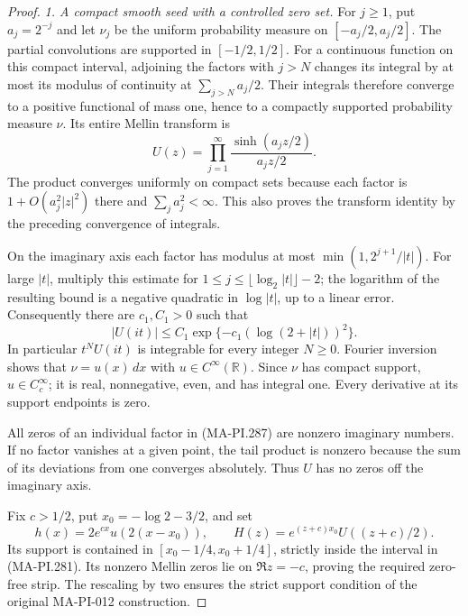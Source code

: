 \begin{proof}
\emph{1. A compact smooth seed with a controlled zero set.}
For \(j\ge1\), put \(a_j=2^{-j}\) and let \(\nu_j\)
be the uniform probability measure on
\([-a_j/2,a_j/2]\).  The partial convolutions are supported
in \([-1/2,1/2]\).  For a continuous function on this
compact interval, adjoining the factors with \(j>N\)
changes its integral by at most its modulus of continuity
at \(\sum_{j>N}a_j/2\).  Their integrals therefore converge
to a positive functional of mass one, hence to a compactly
supported probability measure \(\nu\).  Its entire Mellin
transform is
\[
 U(z)=\prod_{j=1}^{\infty}
           \frac{\sinh(a_jz/2)}{a_jz/2}.
 \tag{MA-PI.287}
\]
The product converges uniformly on compact sets because
each factor is \(1+O(a_j^2|z|^2)\) there and
\(\sum_j a_j^2<\infty\).  This also proves the transform
identity by the preceding convergence of integrals.

On the imaginary axis each factor has modulus at most
\(\min(1,2^{j+1}/|t|)\).  For large \(|t|\), multiply
this estimate for
\(1\le j\le\lfloor\log_2|t|\rfloor-2\); the logarithm
of the resulting bound is a negative quadratic in
\(\log|t|\), up to a linear error.  Consequently there
are \(c_1,C_1>0\) such that
\[
 |U(it)|\le C_1
       \exp\{-c_1(\log(2+|t|))^2\}.
 \tag{MA-PI.288}
\]
In particular \(t^N U(it)\) is integrable for every
integer \(N\ge0\).  Fourier inversion shows that
\(\nu=u(x)\,dx\) with \(u\in C^\infty(\mathbb R)\).
Since \(\nu\) has compact support, \(u\in C_c^\infty\);
it is real, nonnegative, even, and has integral one.
Every derivative at its support endpoints is zero.

All zeros of an individual factor in (MA-PI.287) are
nonzero imaginary numbers.  If no factor vanishes at a
given point, the tail product is nonzero because the
sum of its deviations from one converges absolutely.
Thus \(U\) has no zeros off the imaginary axis.

Fix \(c>1/2\), put \(x_0=-\log2-3/2\), and set
\[
 h(x)=2e^{cx}u(2(x-x_0)),\qquad
 H(z)=e^{(z+c)x_0}U((z+c)/2).
 \tag{MA-PI.289}
\]
Its support is contained in
\([x_0-1/4,x_0+1/4]\), strictly inside the interval
in (MA-PI.281).  Its nonzero Mellin zeros lie on
\(\Re z=-c\), proving the required zero-free strip.
The rescaling by two ensures the strict support condition
of the original MA-PI-012 construction.


\end{proof}
